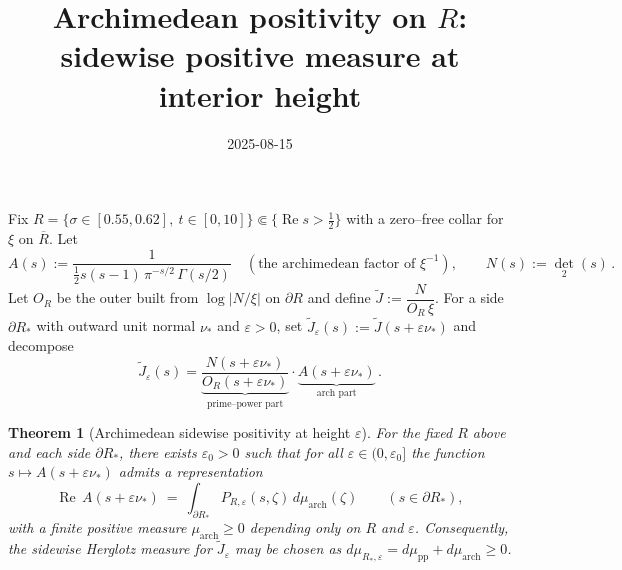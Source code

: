 \documentclass[11pt]{article}
\title{Archimedean positivity on $R$: sidewise positive measure at interior height}
\date{2025-08-15}
\newtheorem{theorem}{Theorem}
\theoremstyle{remark}
\newcommand{\ReS}{\operatorname{Re}}
\begin{document}
\maketitle

Fix $R=\{\sigma\in[0.55,0.62],\ t\in[0,10]\}\Subset\{\ReS s>\tfrac12\}$ with a zero--free collar for $\xi$ on $\overline R$. Let
\[A(s):=\frac{1}{\tfrac12 s(s-1)\,\pi^{-s/2}\,\Gamma(s/2)}\quad(\text{the archimedean factor of }\xi^{-1}),\qquad N(s):=\det_2(s)\,.
\]
Let $O_R$ be the outer built from $\log|N/\xi|$ on $\partial R$ and define $\widetilde J:=\dfrac{N}{O_R\,\xi}$. For a side $\partial R_*$ with outward unit normal $\nu_*$ and $\varepsilon>0$, set $\widetilde J_\varepsilon(s):=\widetilde J(s+\varepsilon\nu_*)$ and decompose
\[\widetilde J_\varepsilon(s)=\underbrace{\frac{N(s+\varepsilon\nu_*)}{O_R(s+\varepsilon\nu_*)}}_{\text{prime--power part}}\cdot\underbrace{A(s+\varepsilon\nu_*)}_{\text{arch part}}\,.
\]

\begin{theorem}[Archimedean sidewise positivity at height $\varepsilon$]\label{thm:arch-pos}
For the fixed $R$ above and each side $\partial R_*$, there exists $\varepsilon_0>0$ such that for all $\varepsilon\in(0,\varepsilon_0]$ the function $s\mapsto A(s+\varepsilon\nu_*)$ admits a representation
\[\ReS\,A(s+\varepsilon\nu_*)\ =\ \int_{\partial R_*} P_{R,\varepsilon}(s,\zeta)\, d\mu_{\mathrm{arch}}(\zeta)\qquad(s\in \partial R_*),\]
with a finite \emph{positive} measure $\mu_{\mathrm{arch}}\ge0$ depending only on $R$ and $\varepsilon$. Consequently, the sidewise Herglotz measure for $\widetilde J_\varepsilon$ may be chosen as $d\mu_{R_*,\varepsilon}=d\mu_{\mathrm{pp}}+d\mu_{\mathrm{arch}}\ge0$.
\end{theorem}
\end{document}

